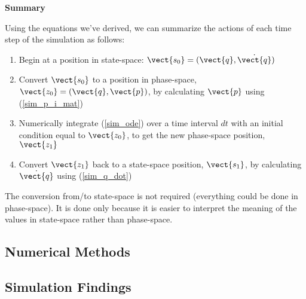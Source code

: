 \textbf{Summary}

Using the equations we've derived, we can summarize the actions of each time step of the simulation as follows:

\begin{enumerate}
    \item Begin at a position in state-space: $\vect{s_0} = (\vect{q}, \Dot{\vect{q}})$
    \item Convert $\vect{s_0}$ to a position in phase-space, $\vect{z_0} = (\vect{q}, \vect{p})$, by calculating $\vect{p}$ using (\ref{sim_p_i_mat})
    \item Numerically integrate (\ref{sim_ode}) over a time interval $d t$ with an initial condition equal to $\vect{z_0}$, to get the new phase-space position, $\vect{z_1}$
    \item Convert $\vect{z_1}$ back to a state-space position, $\vect{s_1}$, by calculating $\Dot{\vect{q}}$ using (\ref{sim_q_dot})
\end{enumerate}

The conversion from/to state-space is not required (everything could be done in phase-space). It is done only because it is easier to interpret the meaning of the values in state-space rather than phase-space.

\subsection{Numerical Methods}

\subsection{Simulation Findings}